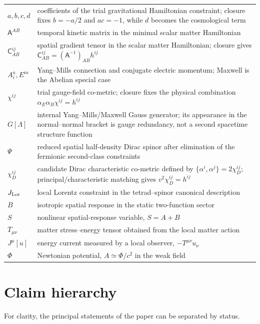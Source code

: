 \documentclass[11pt]{article}
\begin{document}
\begin{center}
\begin{tabular}{@{}>{\raggedright\arraybackslash}p{}p{}@{}}
$a,b,c,d$ & coefficients of the trial gravitational Hamiltonian constraint; closure fixes $b=-a/2$ and $ac=-1$, while $d$ becomes the cosmological term \\
$\mathsf A^{AB}$ & temporal kinetic matrix in the minimal scalar matter Hamiltonian \\
$\mathsf C^{ij}_{AB}$ & spatial gradient tensor in the scalar matter Hamiltonian; closure gives $\mathsf C^{ij}_{AB}=(\mathsf A^{-1})_{AB}h^{ij}$ \\
$A_i^a,E^{ia}$ & Yang--Mills connection and conjugate electric momentum; Maxwell is the Abelian special case \\
$\chi^{ij}$ & trial gauge-field co-metric; closure fixes the physical combination $\alpha_E\alpha_B\chi^{ij}=h^{ij}$ \\
$G[\Lambda]$ & internal Yang--Mills/Maxwell Gauss generator; its appearance in the normal--normal bracket is gauge redundancy, not a second spacetime structure function \\
$\Psi$ & reduced spatial half-density Dirac spinor after elimination of the fermionic second-class constraints \\
$\chi_D^{ij}$ & candidate Dirac characteristic co-metric defined by $\{\alpha^i,\alpha^j\}=2\chi_D^{ij}$; principal/characteristic matching gives $v^2\chi_D^{ij}=h^{ij}$ \\
$J_{\rm Lor}$ & local Lorentz constraint in the tetrad--spinor canonical description \\
$B$ & isotropic spatial response in the static two-function sector \\
$S$ & nonlinear spatial-response variable, $S=A+B$ \\
$T_{\mu\nu}$ & matter stress--energy tensor obtained from the local matter action \\
$J^\mu[u]$ & energy current measured by a local observer, $-T^{\mu\nu}u_\nu$ \\
$\Phi$ & Newtonian potential, $A\simeq\Phi/c^2$ in the weak field \\
\bottomrule
\end{tabular}
\end{center}

\section{Claim hierarchy}

For clarity, the principal statements of the paper can be separated by status.
\end{document}
